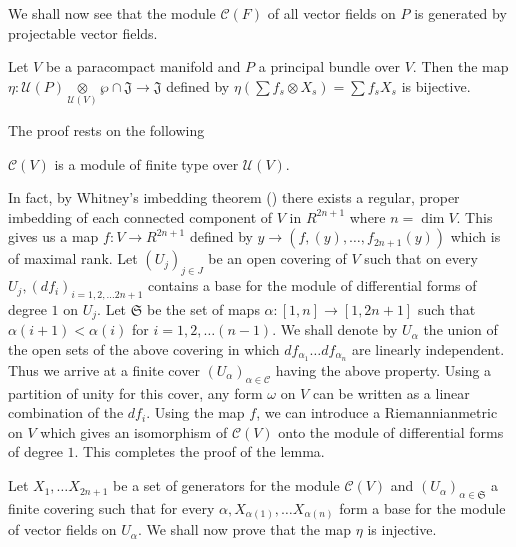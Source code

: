 We shall now see that the module $\mathscr{C}(F)$ of all vector fields
on $P$ is generated by projectable vector fields. 

\begin{theorem}\label{chap3:sec2:thm2}%
  Let $V$ be a paracompact manifold and $P$ a principal bundle over
  $V$. Then the map $\eta : \mathscr{U}(P)
  \underset{\mathscr{U}(V)}{\otimes} \wp \cap \mathfrak{J} \rightarrow
  \mathfrak{J}$ defined by $\eta (\sum f_s \otimes X_s) = \sum f_s X_s
  $ is bijective. 
\end{theorem}

The proof rests on the following
\setcounter{lem}{0}
\begin{lem}\label{chap3:sec2:lem1} %
  $\mathscr{C}(V)$ is a module of finite type over $\mathscr{U}(V)$.
\end{lem}

In fact, by Whitney's imbedding theorem (\cite{28}) there exists a
regular, proper imbedding of each connected component of $V$ in
$R^{2n+1}$ where $n = \dim V$. This gives us a map $f : V \rightarrow
R^{2n + 1}$ defined by $y \rightarrow (f,(y),\ldots, f_{2n+1}(y))$
which is of maximal rank. Let $(U_j)_{j \in J}$ be an open covering of
$V$ such that on every $U_j, (df_i)_{i = 1,2,\ldots 2n+1}$ contains a
base for the module of differential forms of degree $1$ on $U_j$. Let
$\mathfrak{S}$ be the set of maps $\alpha : [1,n] \rightarrow
[1,2n+1]$ such that $\alpha(i+1) < \alpha(i)$ for $i = 1,2,\ldots
(n-1)$. We shall denote by $U_\alpha$ the union of the open sets of
the above covering in which $df_{\alpha_1}\ldots df_{\alpha_n}$ are
linearly independent. Thus we arrive at a finite cover
$(U_\alpha)_{\alpha \in \mathscr{C}}$ having the above property. Using
a partition of unity for this cover, any form $\omega$ on $V$ can be
written as a linear combination of the $df_i$. Using the map
$f$, we can introduce a Riemannian\pageoriginale metric on $V$ which gives an
isomorphism of $\mathscr{C}(V)$ onto the module of differential forms
of degree $1$. This completes the proof of the lemma. 

\begin{proofofthetheorem} 
  Let $X_1, \ldots X_{2n+1}$ be a set of
  generators for the module $\mathscr{C}(V)$ and $(U_\alpha)_{\alpha \in
    \mathfrak{S}}$ a finite covering such that for every \break $\alpha,
  X_{\alpha(1)}, \ldots X_{\alpha(n)}$ form a base for the module of
  vector fields on $U_\alpha$. We shall now prove that the map $\eta$ is
  injective. 
\end{proofofthetheorem}

